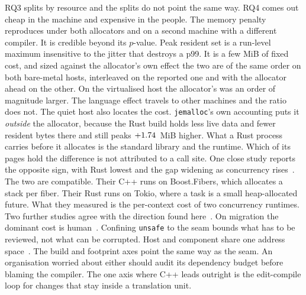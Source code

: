 \documentclass[english,twoside,openright,a4paper,censored,csm,software-track-2020]{HYthesisML}
\begin{document}
RQ3 splits by resource and the splits do not point the same way. RQ4 comes out cheap in
the machine and expensive in the people. The memory penalty reproduces under both
allocators and on a second machine with a different compiler. It is credible beyond its
$p$-value. Peak resident set is a run-level maximum insensitive to the jitter that
destroys a p99. It is a few MiB of fixed cost, and sized against the allocator's own
effect the two are of the same order on both bare-metal hosts, interleaved on the reported
one and with the allocator ahead on the other. On the virtualised host the allocator's was
an order of magnitude larger. The language effect travels to other machines and the ratio
does not. The quiet host also locates
the cost. \texttt{jemalloc}'s own accounting puts it \emph{outside} the allocator,
because the Rust build holds less live data and fewer resident bytes there and still
peaks $+1.74$~MiB higher. What a Rust process carries before it allocates is the
standard library and the runtime. Which of its pages hold the difference is not
attributed to a call site. One close study reports the
opposite sign, with Rust lowest and the gap widening as concurrency
rises~\cite{karlback2021ran}. The two are compatible. Their C++ runs on Boost.Fibers,
which allocates a stack per fiber. Their Rust runs on Tokio, where a task is a small
heap-allocated future. What they measured is the per-context cost of two concurrency
runtimes. Two further studies agree with the direction found
here~\cite{olsson2023ranmgmt,sundvisson2026drivers}. On migration the dominant cost is
human~\cite{fulton2021adopting,crichton2024learning}. Confining \texttt{unsafe} to the
seam bounds what has to be reviewed, not what can be corrupted. Host and component share
one address space~\cite{rivera2021galeed,kirth2022pkrusafe}. The build and footprint axes
point the same way as the seam. An organisation worried about either should audit its
dependency budget before blaming the compiler. The one axis where C++ leads outright is
the edit-compile loop for changes that stay inside a translation unit.
\end{document}
